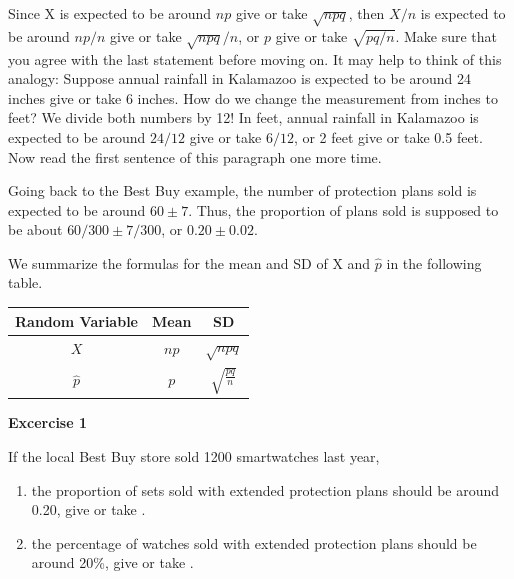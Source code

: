 \documentclass[11pt, chapterprefix=true]{scrbook}\usepackage[]{graphicx}\usepackage[]{color}
\begin{document}
Since X is expected to be around $np$ give or take $\sqrt{npq}$, then $X/n$ is expected to be around $np/n$ give or take $\sqrt{npq}/n$, or $p$ give or take $\sqrt{pq/n}$.  Make sure that you agree with the last statement before moving on.  It may help to think of this analogy: Suppose annual rainfall in Kalamazoo is expected to be around 24 inches give or take 6 inches.  How do we change the measurement from inches to feet?  We divide both numbers by 12! In feet, annual rainfall in Kalamazoo is expected to be around $24/12$ give or take $6/12$, or 2 feet give or take 0.5 feet.  Now read the first sentence of this paragraph one more time.

Going back to the Best Buy example, the number of protection plans sold is expected to be around $60 \pm 7$.   Thus, the proportion of plans sold is supposed to be about $60/300 \pm 7/300$, or $0.20 \pm 0.02$.

We summarize the formulas for the mean and SD of X and $\hat{p}$ in the following table.

\begin{table}[ht]
\centering
\begin{tabular}{@{} ccc @{}} \hline
Random Variable & Mean & SD \\ \hline
$X$ & $np$ & $\sqrt{npq}$ \\
$\hat{p}$ & $p$ & $\sqrt{\frac{pq}{n}}$  \\ \hline
\end{tabular}
\end{table}


\begin{minipage}[ht]{3cm}

\vspace{-31mm}

\textbf{Excercise 1}
\end{minipage}
\begin{minipage}[ht]{11cm}

\parbox{11cm}{
If the local Best Buy store sold 1200 smartwatches last year,

\begin{enumerate}
\item the proportion of sets sold with extended protection plans should be around 0.20, give or take \underline{\phantom{xxxxxxxx}}.
\item the percentage of watches sold with extended protection plans should be around 20\%, give or take \underline{\phantom{xxxxxxxx}}.
\end{enumerate}
}
\end{minipage}
\end{document}
